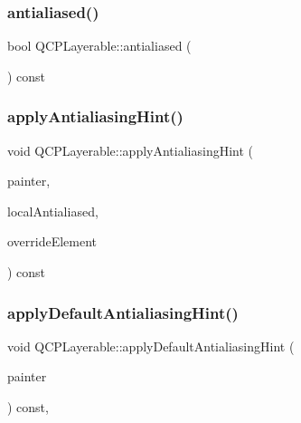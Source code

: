\subsubsection{\texorpdfstring{antialiased()}{antialiased()}}
{\footnotesize\ttfamily bool Q\+C\+P\+Layerable\+::antialiased (\begin{DoxyParamCaption}{ }\end{DoxyParamCaption}) const\hspace{0.3cm}{\ttfamily [inline]}}

\mbox{\label{class_q_c_p_layerable_acb663e375d2d36dc5c55021ee5a2119b}} 
\subsubsection{\texorpdfstring{apply\+Antialiasing\+Hint()}{applyAntialiasingHint()}}
{\footnotesize\ttfamily void Q\+C\+P\+Layerable\+::apply\+Antialiasing\+Hint (\begin{DoxyParamCaption}\item[{\hyperlink{class_q_c_p_painter}{Q\+C\+P\+Painter} $\ast$}]{painter,  }\item[{bool}]{local\+Antialiased,  }\item[{\hyperlink{namespace_q_c_p_ae55dbe315d41fe80f29ba88100843a0c}{Q\+C\+P\+::\+Antialiased\+Element}}]{override\+Element }\end{DoxyParamCaption}) const\hspace{0.3cm}{\ttfamily [protected]}}

\mbox{\label{class_q_c_p_layerable_afdf83ddc6a265cbf4c89fe99d3d93473}} 
\subsubsection{\texorpdfstring{apply\+Default\+Antialiasing\+Hint()}{applyDefaultAntialiasingHint()}}
{\footnotesize\ttfamily void Q\+C\+P\+Layerable\+::apply\+Default\+Antialiasing\+Hint (\begin{DoxyParamCaption}\item[{\hyperlink{class_q_c_p_painter}{Q\+C\+P\+Painter} $\ast$}]{painter }\end{DoxyParamCaption}) const\hspace{0.3cm}{\ttfamily [protected]}, {}}



